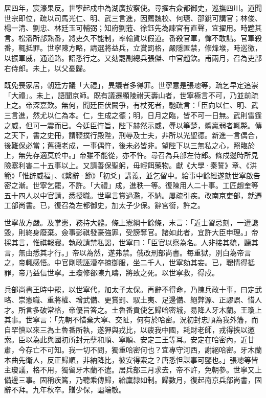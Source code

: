 \begin{pinyinscope}
居四年，宸濠果反。世寧起戍中為湖廣按察使。尋擢右僉都御史，巡撫四川。道聞世宗即位，疏以司馬光仁、明、武三言進，因薦魏校、何瑭、邵銳可講官；林俊、楊一清、劉忠、林廷玉可輔弼；知府劉蒞、徐鈺先為諫官有直聲，宜擢用。時韙其言。松潘所部熟番，將吏久不能制，率輸貨以假道。番殺官軍，憚不敢詰。官軍殺番，輒抵罪。世寧陳方略，請選將益兵，立賞罰格，嚴隱匿禁，修烽堠，時巡徼，以振軍威，通道路。詔悉行之。又劾罷副總兵張傑、中官趙欽。甫兩月，召為吏部右侍郎。未上，以父憂歸。

既免喪家居，朝廷方議「大禮」，異議者多得罪。世寧意是張璁等，疏乞早定追崇「大禮」。未上，語聞京師。既有議遷顯陵祔天壽山者，世寧極言不可，乃並前疏上之。帝深嘉歎。無何，聞廷臣伏闕爭，有杖死者，馳疏言：「臣向以仁、明、武三言進，然尤以仁為本。仁，生成之德；明，日月之臨，皆不可一日無。武則雷霆之威，但可一震而已。今廷臣忤旨，陛下赫然示威，辱以箠楚，體羸弱者輒斃。傳之天下，書之史冊，謂鞭撲行殿陛，刑辱及士夫，非所以光聖德。新進一言偶合，後難保必當；舊德老成，一事偶忤，後未必皆非。望陛下以三無私之心，照臨於上，無先存適莫於中。」帝雖不能從，亦不忤。尋召為兵部左侍郎。條戍邊時所見險塞利害二十五事以上。又請善保聖躬，毋輕餌藥物。獻《大學·秦誓》章、《洪範》「惟辟威福」、《繫辭·節》「初爻」講義，並乞留中。給事中餘經遂劾世寧啟告密之漸。世寧乞罷，不許。「大禮」成，進秩一等。復陳用人二十事。工匠趙奎等五十四人以中官請，悉授職。世寧言賞過濫，不納。屢疏引疾。改南京吏部，就遷工部尚書。已，復召為左都御史，加太子少保。辭宮銜，許之。

世寧故方嚴。及掌憲，務持大體。條上憲綱十餘條，末言：「近士習忌刻，一遭讒毀，則終身廢棄。僉事彭祺發豪強罪，受謗奪官。諸如此者，宜許大臣申理。」帝採其言，惟祺報寢。執政請禁私謁，世寧曰：「臣官以察為名。人非接其貌，聽其言，無由悉其才行。」帝以為然，遂弗禁。俄改刑部尚書。每重獄，別白為帝言之，帝輒感悟。中官剛聰誣漕卒掠御服，坐二千人，世寧劾其妄。已，聰情得抵罪，帝乃益信世寧。王瓊修郤陳九疇，將致之死。以世寧救，得戍。

兵部尚書王時中罷，以世寧代，加太子太保。再辭不得命，乃陳兵政十事，曰定武略、崇憲職、重將權、增武備、更賞罰、馭土夷、足邊備、絕弊源、正謬誤、惜人才。所言多破常格，帝優旨答之。土魯番貢使乞歸哈密城，易降人牙木蘭。王瓊上其事。世寧言：「先朝不惜棄大寧、交阯，何有於哈密。況初封忠順為我外籓，而自罕慎以來三為土魯番所執，遂狎與戎比，以疲我中國，耗財老師，戎得挾以邀索。臣以為此與國初所封元孽和順、寧順、安定三王等耳。安定在哈密內，近甘肅，今存亡不可知。我一切不問，獨重哈密何也？宜專守河西，謝絕哈密。牙木蘭本曲先衛人，反正歸順，非納降比，彼安得索之？唐悉怛謀事可鑒也。」張璁等皆主瓊議，格不用，獨留牙木蘭不遣。居兵部三月求去，帝不許，免朝參。世寧又上備邊三事。固稱疾篤，乃聽乘傳歸，給廩隸如制。歸數月，復起南京兵部尚書，固辭不拜。九年秋卒。贈少保，謚端敏。


\end{pinyinscope}
